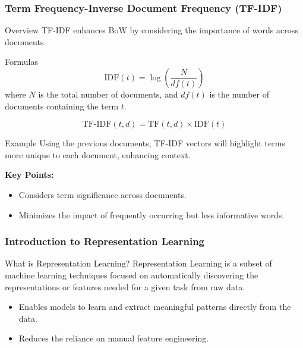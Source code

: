 \documentclass[aspectratio=169]{beamer}
\begin{document}
\begin{frame}[fragile]
    \frametitle{Term Frequency-Inverse Document Frequency (TF-IDF)}
    \begin{block}{Overview}
        TF-IDF enhances BoW by considering the importance of words across documents.
    \end{block}
    
    \begin{block}{Formulas}
        \begin{equation}
            \text{IDF}(t) = \log\left(\frac{N}{df(t)}\right)
        \end{equation}
        where $N$ is the total number of documents, and $df(t)$ is the number of documents containing the term $t$.
        
        \begin{equation}
            \text{TF-IDF}(t, d) = \text{TF}(t, d) \times \text{IDF}(t)
        \end{equation}
    \end{block}
    
    \pause
    
    \begin{block}{Example}
    Using the previous documents, TF-IDF vectors will highlight terms more unique to each document, enhancing context.
    
    \textbf{Key Points:}
    \begin{itemize}
        \item Considers term significance across documents.
        \item Minimizes the impact of frequently occurring but less informative words.
    \end{itemize}
    \end{block}
\end{frame}

\begin{frame}[fragile]
    \frametitle{Introduction to Representation Learning}
    
    \begin{block}{What is Representation Learning?}
        Representation Learning is a subset of machine learning techniques focused on automatically discovering the representations or features needed for a given task from raw data. 
    \end{block}
    
    \begin{itemize}
        \item Enables models to learn and extract meaningful patterns directly from the data.
        \item Reduces the reliance on manual feature engineering.
    \end{itemize}

\end{frame}
\end{document}
